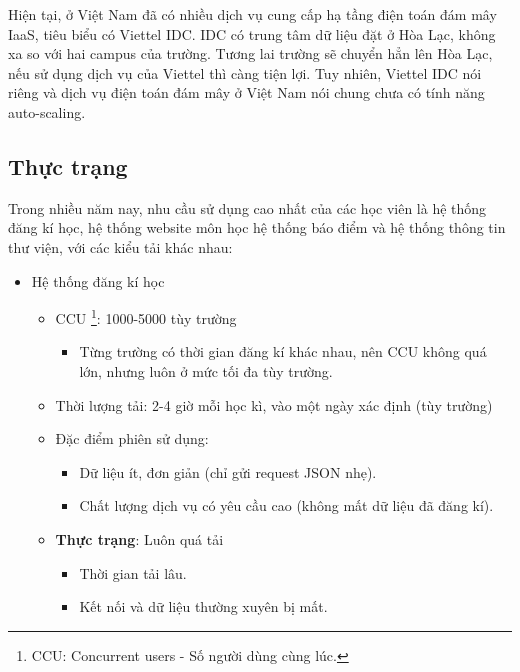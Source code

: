 \documentclass{article}
\begin{document}
Hiện tại, ở Việt Nam đã có nhiều dịch vụ cung cấp hạ tầng điện toán đám mây
IaaS, tiêu biểu có Viettel IDC. IDC có trung tâm dữ liệu đặt ở Hòa Lạc, không xa
so với hai campus của trường. Tương lai trường sẽ chuyển hẳn lên Hòa Lạc, nếu sử
dụng dịch vụ của Viettel thì càng tiện lợi. Tuy nhiên, Viettel IDC nói riêng và
dịch vụ điện toán đám mây ở Việt Nam nói chung chưa có tính năng auto-scaling.

\subsection{Thực trạng}
Trong nhiều năm nay, nhu cầu sử dụng cao nhất của các học viên là hệ thống đăng
kí học, hệ thống website môn học hệ thống báo điểm và hệ thống thông tin thư
viện, với các kiểu tải khác nhau:

\begin{itemize}
    \item Hệ thống đăng kí học
        \begin{itemize}
            \item CCU \footnote{CCU: Concurrent users - Số người dùng cùng
            lúc.}: 1000-5000 tùy trường
                \begin{itemize}
                    \item Từng trường có thời gian đăng kí khác nhau, nên CCU
                    không quá lớn, nhưng luôn ở mức tối đa tùy trường.
                \end{itemize}
            \item Thời lượng tải: 2-4 giờ mỗi học kì, vào một ngày xác định (tùy
            trường)
            \item Đặc điểm phiên sử dụng:
                \begin{itemize}
                    \item Dữ liệu ít, đơn giản (chỉ gửi request JSON nhẹ).
                    \item Chất lượng dịch vụ có yêu cầu cao (không mất dữ liệu
                    đã đăng kí).
                \end{itemize}
            \item \textbf{Thực trạng}: Luôn quá tải
                \begin{itemize}
                    \item Thời gian tải lâu.
                    \item Kết nối và dữ liệu thường xuyên bị mất.
                \end{itemize}
        \end{itemize}

\end{itemize}
\end{document}
